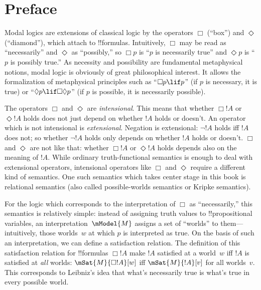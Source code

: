 
\chapter{Preface}

Modal logics are extensions of classical logic by the operators $\Box$
(``box'') and $\Diamond$ (``diamond''), which attach to !!{formula}s.
Intuitively, $\Box$ may be read as ``necessarily'' and $\Diamond$ as
``possibly,'' so $\Box p$ is ``$p$ is necessarily true'' and $\Diamond
p$ is ``$p$ is possibly true.'' As necessity and possibility are
fundamental metaphysical notions, modal logic is obviously of great
philosophical interest. It allows the formalization of metaphysical
principles such as ``$\Box p \lif p$'' (if $p$ is necessary, it is
true) or ``$\Diamond p \lif \Box\Diamond p$'' (if $p$ is possible,
it is necessarily possible).

The operators $\Box$ and $\Diamond$ are \emph{intensional}. This means
that whether $\Box !A$ or $\Diamond !A$ holds does not just depend on
whether $!A$ holds or doesn't.  An operator which is not intensional
is \emph{extensional}. Negation is extensional: $\lnot !A$ holds iff
$!A$ does not; so whether $\lnot !A$ holds only depends on whether
$!A$ holds or doesn't. $\Box$ and $\Diamond$ are not like that:
whether $\Box !A$ or $\Diamond !A$ holds depends also on the meaning
of $!A$.  While ordinary truth-functional semantics is enough to deal
with extensional operators, intensional operators like $\Box$ and
$\Diamond$ require a different kind of semantics. One such semantics
which takes center stage in this book is relational semantics (also
called possible-worlds semantics or Kripke semantics). 

For the logic which corresponds to the interpretation of $\Box$ as
``necessarily,'' this semantics is relatively simple: instead of
assigning truth values to !!{propositional variable}s, an
interpretation~$\mModel{M}$ assigns a set of ``worlds'' to
them---intuitively, those worlds~$w$ at which $p$ is interpreted as true.
On the basis of such an interpretation, we can define a satisfaction
relation. The definition of this satisfaction relation for
!!{formula}s $\Box !A$ make $!A$ satisfied at a world~$w$ iff $!A$ is
satisfied at \emph{all} worlds: $\mSat{M}{\Box !A}[w]$ iff
$\mSat{M}{!A}[v]$ for all worlds~$v$. This corresponds to Leibniz's
idea that what's necessarily true is what's true in every possible world.

